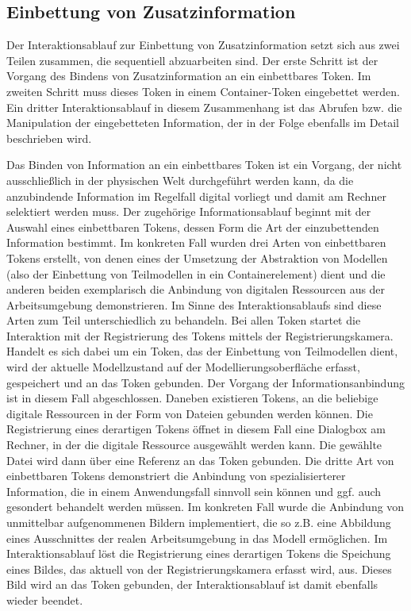 
\subsection{Einbettung von Zusatzinformation} %
\label{sub:einbettung_von_zusatzinformation}

Der Interaktionsablauf zur Einbettung von Zusatzinformation setzt sich aus zwei Teilen zusammen, die sequentiell abzuarbeiten sind. Der erste Schritt ist der Vorgang des Bindens von Zusatzinformation an ein einbettbares Token. Im zweiten Schritt muss dieses Token in einem Container-Token eingebettet werden. Ein dritter Interaktionsablauf in diesem Zusammenhang ist das Abrufen  bzw. die Manipulation der eingebetteten Information, der in der Folge ebenfalls im Detail beschrieben wird.

Das Binden von Information an ein einbettbares Token ist ein Vorgang, der nicht ausschließlich in der physischen Welt durchgeführt werden kann, da die anzubindende Information im Regelfall digital vorliegt und damit am Rechner selektiert werden muss. Der zugehörige Informationsablauf beginnt mit der Auswahl eines einbettbaren Tokens, dessen Form die Art der einzubettenden Information bestimmt. Im konkreten Fall wurden drei Arten von einbettbaren Tokens erstellt, von denen eines der Umsetzung der Abstraktion von Modellen (also der Einbettung von Teilmodellen in ein Containerelement) dient und die anderen beiden exemplarisch die Anbindung von digitalen Ressourcen aus der Arbeitsumgebung demonstrieren. Im Sinne des Interaktionsablaufs sind diese Arten zum Teil unterschiedlich zu behandeln. Bei allen Token startet die Interaktion mit der Registrierung des Tokens mittels der Registrierungskamera. Handelt es sich dabei um ein Token, das der Einbettung von Teilmodellen dient, wird der aktuelle Modellzustand auf der Modellierungsoberfläche erfasst, gespeichert und an das Token gebunden. Der Vorgang der Informationsanbindung ist in diesem Fall abgeschlossen. Daneben existieren Tokens, an die beliebige digitale Ressourcen in der Form von Dateien gebunden werden können. Die Registrierung eines derartigen Tokens öffnet in diesem Fall eine Dialogbox am Rechner, in der die digitale Ressource ausgewählt werden kann. Die gewählte Datei wird dann über eine Referenz an das Token gebunden. Die dritte Art von einbettbaren Tokens demonstriert die Anbindung von spezialisierterer Information, die in einem Anwendungsfall sinnvoll sein können und ggf. auch gesondert behandelt werden müssen. Im konkreten Fall wurde die Anbindung von unmittelbar aufgenommenen Bildern implementiert, die so z.B. eine Abbildung eines Ausschnittes der realen Arbeitsumgebung in das Modell ermöglichen. Im Interaktionsablauf löst die Registrierung eines derartigen Tokens die Speichung eines Bildes, das aktuell von der Registrierungskamera erfasst wird, aus. Dieses Bild wird an das Token gebunden, der Interaktionsablauf ist damit ebenfalls wieder beendet.

